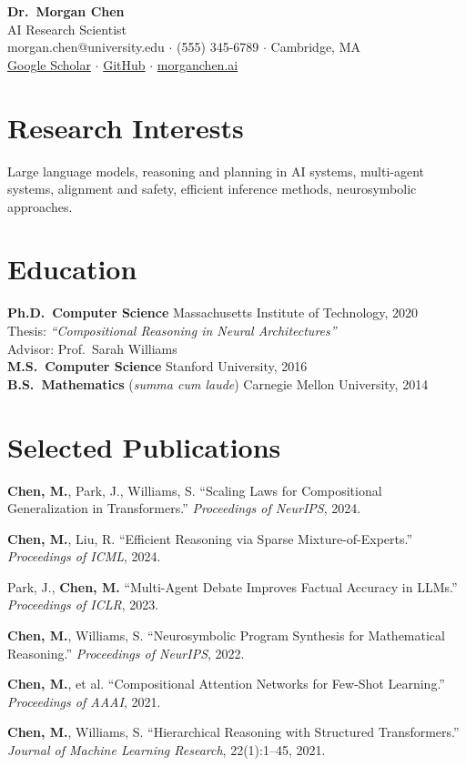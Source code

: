 \documentclass[11pt,a4paper]{article}
\begin{document}
\begin{center}
{\LARGE\bfseries Dr.\ Morgan Chen}\\[0.3em]
{\large AI Research Scientist}\\[0.3em]
\small morgan.chen@university.edu $\cdot$ (555) 345-6789 $\cdot$ Cambridge, MA\\
\small \href{https://scholar.google.com/citations?user=mchen}{Google Scholar} $\cdot$ \href{https://github.com/morganchen}{GitHub} $\cdot$ \href{https://morganchen.ai}{morganchen.ai}
\end{center}

\section{Research Interests}
Large language models, reasoning and planning in AI systems, multi-agent systems, alignment and safety, efficient inference methods, neurosymbolic approaches.

\section{Education}
\noindent\textbf{Ph.D.\ Computer Science} \hfill Massachusetts Institute of Technology, 2020\\
\indent Thesis: \textit{``Compositional Reasoning in Neural Architectures''}\\
\indent Advisor: Prof.\ Sarah Williams\\[0.4em]
\textbf{M.S.\ Computer Science} \hfill Stanford University, 2016\\[0.4em]
\textbf{B.S.\ Mathematics} (\textit{summa cum laude}) \hfill Carnegie Mellon University, 2014

\section{Selected Publications}
\begin{enumerate}[leftmargin=2em,nosep,label={[\arabic*]}]
\item \textbf{Chen, M.}, Park, J., Williams, S. ``Scaling Laws for Compositional Generalization in Transformers.'' \textit{Proceedings of NeurIPS}, 2024.
\item \textbf{Chen, M.}, Liu, R. ``Efficient Reasoning via Sparse Mixture-of-Experts.'' \textit{Proceedings of ICML}, 2024.
\item Park, J., \textbf{Chen, M.} ``Multi-Agent Debate Improves Factual Accuracy in LLMs.'' \textit{Proceedings of ICLR}, 2023.
\item \textbf{Chen, M.}, Williams, S. ``Neurosymbolic Program Synthesis for Mathematical Reasoning.'' \textit{Proceedings of NeurIPS}, 2022.
\item \textbf{Chen, M.}, et al. ``Compositional Attention Networks for Few-Shot Learning.'' \textit{Proceedings of AAAI}, 2021.
\item \textbf{Chen, M.}, Williams, S. ``Hierarchical Reasoning with Structured Transformers.'' \textit{Journal of Machine Learning Research}, 22(1):1--45, 2021.
\end{enumerate}
\end{document}

